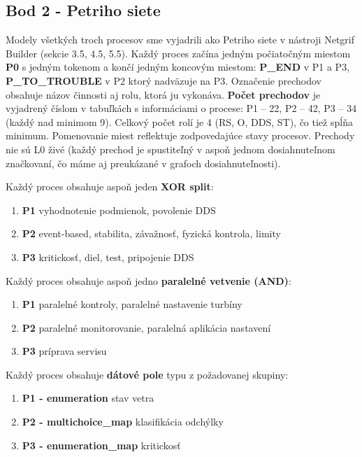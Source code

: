 \documentclass[12pt,a4paper]{article}
\begin{document}
\subsection{Bod 2 - Petriho siete}
Modely všetkých troch procesov sme vyjadrili ako Petriho siete
v nástroji Netgrif Builder (sekcie 3.5, 4.5, 5.5). Každý proces začína jedným počiatočným miestom \textbf{P0} s jedným tokenom a končí jedným koncovým miestom: \textbf{P\_END} v P1 a P3, \textbf{P\_TO\_TROUBLE} v P2 ktorý nadväzuje na P3. Označenie prechodov obsahuje názov činnosti aj rolu, ktorá ju vykonáva. \textbf{Počet prechodov} je vyjadrený číslom v tabuľkách s informáciami o procese: P1 -- 22, P2 -- 42, P3 -- 34 (každý nad minimom 9). {Celkový počet rolí} je 4 (RS, O, DDS, ST), čo tiež spĺňa minimum. Pomenovanie miest reflektuje zodpovedajúce stavy procesov. Prechody nie sú L0 živé (každý prechod je spustiteľný
v aspoň jednom dosiahnuteľnom značkovaní, čo máme aj preukázané v grafoch dosiahnuteľnosti). 

\vspace{0.6em}
Každý proces obsahuje aspoň jeden \textbf{XOR split}:
\begin{enumerate}[noitemsep, topsep=2pt, leftmargin=1.5cm]
    \item \textbf{P1} vyhodnotenie podmienok, povolenie DDS
    \item \textbf{P2} event-based,
    stabilita, závažnosť, fyzická kontrola, limity
    \item \textbf{P3} kritickosť,
    diel, test, pripojenie DDS
\end{enumerate}
\vspace{0.6em}

\vspace{0.6em}
Každý proces obsahuje aspoň jedno \textbf{paralelné vetvenie (AND)}:
\begin{enumerate}[noitemsep, topsep=2pt, leftmargin=1.5cm]
    \item \textbf{P1} paralelné kontroly, paralelné nastavenie turbíny
    \item \textbf{P2} paralelné monitorovanie, paralelná aplikácia nastavení
    \item \textbf{P3} príprava servisu
\end{enumerate}
\vspace{0.6em}

Každý proces obsahuje \textbf{dátové pole} typu z požadovanej skupiny:
\begin{enumerate}[noitemsep, topsep=2pt, leftmargin=1.5cm]
    \item \textbf{P1 - enumeration} stav vetra
    \item \textbf{P2 - multichoice\_map} klasifikácia odchýlky
    \item \textbf{P3 - enumeration\_map} kritickosť
\end{enumerate}
\vspace{0.6em}
\end{document}
